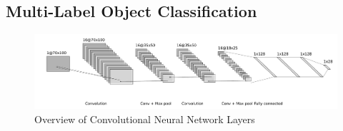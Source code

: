 
\subsection{Multi-Label Object Classification}

\begin{figure}[!h]
 \begin{center}
   \includegraphics[width=1.1\textwidth]{./images/object_net.pdf}
   \caption{Overview of Convolutional Neural Network Layers}
   \label{fig:cnn}
 \end{center}
\end{figure}


